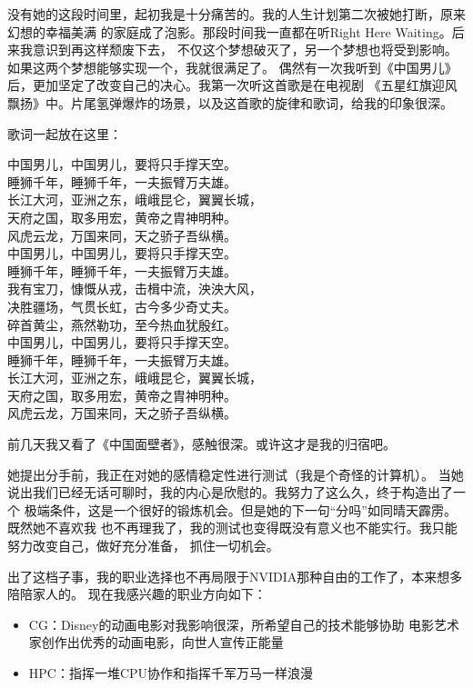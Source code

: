没有她的这段时间里，起初我是十分痛苦的。我的人生计划第二次被她打断，原来幻想的幸福美满
的家庭成了泡影。那段时间我一直都在听Right Here Waiting。后来我意识到再这样颓废下去，
不仅这个梦想破灭了，另一个梦想也将受到影响。如果这两个梦想能够实现一个，我就很满足了。
偶然有一次我听到《中国男儿》后，更加坚定了改变自己的决心。我第一次听这首歌是在电视剧
《五星红旗迎风飘扬》中。片尾氢弹爆炸的场景，以及这首歌的旋律和歌词，给我的印象很深。

歌词一起放在这里：
\begin{center}
中国男儿，中国男儿，要将只手撑天空。\\
睡狮千年，睡狮千年，一夫振臂万夫雄。\\
长江大河，亚洲之东，峨峨昆仑，翼翼长城，\\
天府之国，取多用宏，黄帝之胄神明种。\\
风虎云龙，万国来同，天之骄子吾纵横。\\
中国男儿，中国男儿，要将只手撑天空。\\
睡狮千年，睡狮千年，一夫振臂万夫雄。\\
我有宝刀，慷慨从戎，击楫中流，泱泱大风，\\
决胜疆场，气贯长虹，古今多少奇丈夫。\\
碎首黄尘，燕然勒功，至今热血犹殷红。\\
中国男儿，中国男儿，要将只手撑天空。\\
睡狮千年，睡狮千年，一夫振臂万夫雄。\\
长江大河，亚洲之东，峨峨昆仑，翼翼长城，\\
天府之国，取多用宏，黄帝之胄神明种。\\
风虎云龙，万国来同，天之骄子吾纵横。\\
\end{center}

前几天我又看了《中国面壁者》，感触很深。或许这才是我的归宿吧。

她提出分手前，我正在对她的感情稳定性进行测试（我是个奇怪的计算机）。
当她说出我们已经无话可聊时，我的内心是欣慰的。我努力了这么久，终于构造出了一个
极端条件，这是一个很好的锻炼机会。但是她的下一句``分吗''如同晴天霹雳。既然她不喜欢我
也不再理我了，我的测试也变得既没有意义也不能实行。我只能努力改变自己，做好充分准备，
抓住一切机会。

出了这档子事，我的职业选择也不再局限于NVIDIA那种自由的工作了，本来想多陪陪家人的。
现在我感兴趣的职业方向如下：
\begin{itemize}
    \item CG：Disney的动画电影对我影响很深，所希望自己的技术能够协助
    电影艺术家创作出优秀的动画电影，向世人宣传正能量
    \item HPC：指挥一堆CPU协作和指挥千军万马一样浪漫
\end{itemize}

